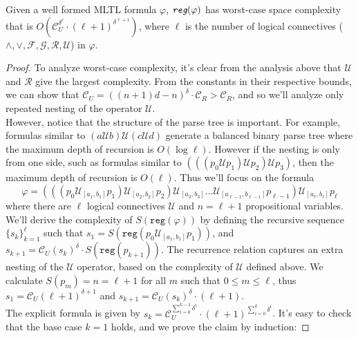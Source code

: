 \documentclass[runningheads]{llncs}
\renewcommand{\phi}{\varphi}
\begin{document}
\begin{theorem}
Given a well formed MLTL formula $\phi$, $\emph{\texttt{reg}}(\phi)$ has worst-case space complexity that is $O(\mathcal{C}_U^{\delta ^ \ell} \cdot (\ell + 1)^{\delta^{\ell + 1}})$, where $\ell$ is the number of logical connectives ($\land, \lor, \mathcal{F}, \mathcal{G}, \mathcal{R}, \mathcal{U}$) in $\phi$. 
\end{theorem}
\begin{proof}
    To analyze worst-case complexity, it's clear from the analysis above that $\mathcal{U}$ and $\mathcal{R}$ give the largest complexity. From the constants in their respective bounds, we can show that $\mathcal{C}_U = ((n+1)d - n)^\delta \cdot \mathcal{C}_R > \mathcal{C}_R$, and so we'll analyze only repeated nesting of the operator $\mathcal{U}$.\\
    However, notice that the structure of the parse tree is important. For example, formulas similar to $(a \mathcal{U} b) \mathcal{U} (c \mathcal{U} d)$ generate a balanced binary parse tree where the maximum depth of recursion is $O(\log \ell)$. However if the nesting is only from one side, such as formulas similar to $(((p_0 \mathcal{U} p_1) \mathcal{U} p_2) \mathcal{U} p_3)$, then the maximum depth of recursion is $O(\ell)$. Thus we'll focus on the formula $$\phi = (((p_0 \mathcal{U}_{[a_1, b_1]} p_1) \mathcal{U}_{[a_2, b_2]} p_2) \mathcal{U}_{[a_3, b_3]}... \mathcal{U}_{[a_{\ell - 1}, b_{\ell - 1}]} p_{\ell - 1}) \mathcal{U}_{[a_\ell, b_\ell]} p_\ell$$ where there are $\ell$ logical connectives $\mathcal{U}$ and $n = \ell + 1$ propositional variables.\\
    We'll derive the complexity of $S(\texttt{reg}(\phi))$ by defining the recursive sequence $\{s_k\}_{k = 1}^\ell$ such that $s_1 = S(\texttt{reg}(p_0 \mathcal{U}_{[a_1, b_1]} p_1))$, and $s_{k+1} = \mathcal{C}_U (s_k)^\delta \cdot S(\texttt{reg}(p_{k+1}))$. The recurrence relation captures an extra nesting of the $\mathcal{U}$ operator, based on the complexity of $\mathcal{U}$ defined above. We calculate $S(p_m) = n = \ell + 1$ for all $m$ such that $0 \leq m \leq \ell$, thus $s_1 = \mathcal{C}_U(\ell + 1)^{\delta + 1}$ and $s_{k+1} = \mathcal{C}_U (s_k)^\delta \cdot (\ell + 1)$. \\
    The explicit formula is given by $s_k = \mathcal{C}_U^{\sum_{i = 0}^{k - 1} \delta^i} \cdot (\ell + 1)^{\sum_{i = 0}^{k} \delta^i}$. It's easy to check that the base case $k = 1$ holds, and we prove the claim by induction:
    \vspace{-0.2cm}

\end{proof}
\end{document}
